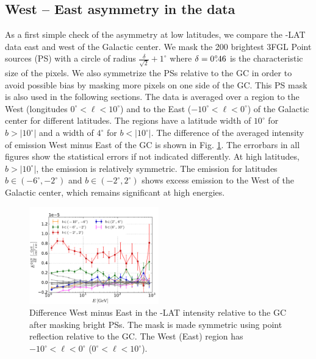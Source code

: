 \subsection{West -- East asymmetry in the data}
\label{sec:data_diff}

As a first simple check of the asymmetry at low latitudes, we compare the \Fermi-LAT data east and west of the Galactic center. 
We mask the 200 brightest 3FGL Point sources (PS)  with a circle of radius $\frac{\delta}{\sqrt{2}} + 1^\circ$ where $\delta = 0^\circ\!\!.46$ is the characteristic size of the pixels. We also symmetrize the PSs relative to the GC in order to avoid possible bias by masking more pixels on one side of the GC. 
This PS mask is also used in the following sections. 
The data is averaged over a region to the West (longitudes $0^\circ < \ell < 10^\circ$) and to the East ($-10^\circ < \ell  <  0^\circ$) of the Galactic center for different latitudes. The regions have a latitude width of $10^\circ$ for $b >|10^\circ|$ and a width of  $4^\circ$ for  $b <|10^\circ|$. 
The difference of the averaged intensity of emission West minus East of the GC is shown in Fig. \ref{fig:data_diff}. The errorbars in all figures show the statistical errors if not indicated differently.
At high latitudes, $b >|10^\circ|$, the emission is relatively symmetric. 
The emission for latitudes $b \in (-6^\circ, -2^\circ)$ and $b \in (-2^\circ, 2^\circ)$ shows excess emission to the West of the Galactic center, which remains significant at high energies. 


\begin{figure}[h]
 \includegraphics[width=0.5\textwidth]{plots/Difference_data_for_different_latitudes.pdf}
 \caption{Difference West minus East in the \Fermi-LAT intensity relative to the GC after masking bright PSs.
 The mask is made symmetric using point reflection relative to the GC.
 The West (East) region has $-10^\circ < \ell <0^\circ$ ($0^\circ < \ell <10^\circ$). }
 \label{fig:data_diff}
\end{figure}

